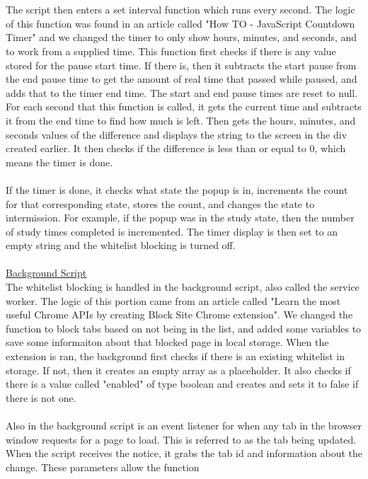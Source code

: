 \documentclass[12pt]{article}
\begin{document}
\\\\The script then enters a set interval function which runs every second. The logic of this function was found in an article called "How TO - JavaScript Countdown Timer" and we changed the timer to only show hours, minutes, and seconds, and to work from a supplied time.
This function first checks if there is any value stored for the pause start time. If there is,
then it subtracts the start pause from the end pause time to get the amount of real time that passed while paused, and adds that to the timer end time.
The start and end pause times are reset to null. For each second that this function is called, it gets the current time and subtracts it from the
end time to find how much is left. Then gets the hours, minutes, and seconds values of the difference and displays the string to the screen in the div created earlier.
It then checks if the difference is less than or equal to 0, which means the timer is done.
\\\\If the timer is done, it checks what state the popup is in, increments the count for that corresponding state, stores the count, and changes the state to intermission.
For example, if the popup was in the study state, then the number of study times completed is incremented. The timer display is then set to an empty string and the whitelist blocking is turned off.
\\\\
\underline{Background Script}\\
The whitelist blocking is handled in the background script, also called the service worker. The logic of this portion came from an article called "Learn the most useful Chrome APIs by creating Block Site Chrome extension". We changed the function to block tabs based on not being in the list, and added some variables to save some informaiton about that blocked page in local storage.
When the extension is ran, the background first checks if there is an existing whitelist in storage. If not, then it creates an empty array as a placeholder.
It also checks if there is a value called "enabled" of type boolean and creates and sets it to false if there is not one.
\\\\Also in the background script is an event listener for when any tab in the browser window requests for a page to load. This is referred to as the tab being updated.
When the script receives the notice, it grabs the tab id and information about the change. These parameters allow the function
\end{document}
